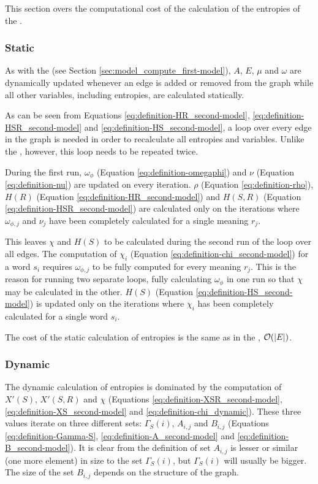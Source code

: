 This section overs the computational cost of the calculation of the entropies of the \secondmodel{}.

\subsubsection{Static}

As with the \firstmodel{} (see Section \ref{sec:model_compute_first-model}), $A$, $E$, $\mu$ and $\omega$ are dynamically updated whenever an edge is added or removed from the graph while all other variables, including entropies, are calculated statically.

As can be seen from Equations \eqref{eq:definition-HR_second-model}, \eqref{eq:definition-HSR_second-model} and \eqref{eq:definition-HS_second-model}, a loop over every edge in the graph is needed in order to recalculate all entropies and variables.
Unlike the \firstmodel{}, however, this loop needs to be repeated twice.

During the first run, $\omega_\phi$ (Equation \eqref{eq:definition-omegaphi}) and $\nu$ (Equation \eqref{eq:definition-nu}) are updated on every iteration.
$\rho$ (Equation \eqref{eq:definition-rho}), $H(R)$ (Equation \eqref{eq:definition-HR_second-model}) and $H(S,R)$ (Equation \eqref{eq:definition-HSR_second-model}) are calculated only on the iterations where $\omega_{\phi,j}$ and $\nu_j$ have been completely calculated for a single meaning $r_j$.

This leaves $\chi$ and $H(S)$ to be calculated during the second run of the loop over all edges.
The computation of $\chi_i$ (Equation \eqref{eq:definition-chi_second-model}) for a word $s_i$ requires $\omega_{\phi,j}$ to be fully computed for every meaning $r_j$.
This is the reason for running two separate loops, fully calculating $\omega_\phi$ in one run so that $\chi$ may be calculated in the other.
$H(S)$ (Equation \eqref{eq:definition-HS_second-model}) is updated only on the iterations where $\chi_i$ has been completely calculated for a single word $s_i$.

The cost of the static calculation of entropies is the same as in the \firstmodel, $\mathcal{O}(|E|)$.

\subsubsection{Dynamic}

The dynamic calculation of entropies is dominated by the computation of $X'(S)$, $X'(S,R)$ and $\chi$ (Equations \eqref{eq:definition-XSR_second-model}, \eqref{eq:definition-XS_second-model} and \eqref{eq:definition-chi_dynamic}).
These three values iterate on three different sets: $\Gamma_S(i)$, $A_{i,j}$ and $B_{i,j}$ (Equations \eqref{eq:definition-Gamma-S}, \eqref{eq:definition-A_second-model} and \eqref{eq:definition-B_second-model}).
It is clear from the definition of set $A_{i,j}$ is lesser or similar (one more element) in size to the set $\Gamma_S(i)$, but $\Gamma_S(i)$ will usually be bigger.
The size of the set $B_{i,j}$ depends on the structure of the graph.

